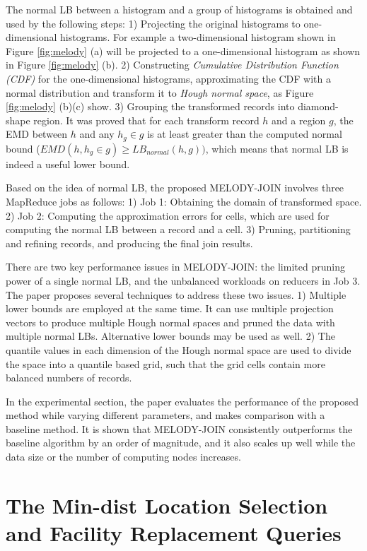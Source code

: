 \documentclass[paper=a4, fontsize=18pt]{article} %
\numberwithin{equation}{section} %
\numberwithin{figure}{section} %
\numberwithin{table}{section} %
\begin{document}
The normal LB between a histogram and a group of histograms is obtained and used by the following steps: 1) Projecting the original histograms to one-dimensional histograms. For example a two-dimensional histogram shown in Figure \ref{fig:melody} (a) will be projected to a one-dimensional histogram as shown in Figure \ref{fig:melody} (b). 2) Constructing \emph{Cumulative Distribution Function (CDF)} for the one-dimensional histograms, approximating the CDF with a normal distribution and transform it to \emph{Hough normal space}, as Figure \ref{fig:melody} (b)(c) show. 3) Grouping the transformed records into diamond-shape region. It was proved that for each transform record $h$ and a region $g$, the EMD between $h$ and any $h_g \in g$ is at least greater than the computed normal bound ($EMD(h, h_g \in g) \geq LB_{normal}(h,g))$, which means that normal LB is indeed a useful lower bound.

Based on the idea of normal LB, the proposed MELODY-JOIN involves three MapReduce jobs as follows: 1) Job 1: Obtaining the domain of transformed space. 2) Job 2: Computing the approximation errors for cells, which are used for computing the normal LB between a record and a cell. 3) Pruning, partitioning and refining records, and producing the final join results.

There are two key performance issues in MELODY-JOIN: the limited pruning power of a single normal LB, and the unbalanced workloads on reducers in Job 3. The paper proposes several techniques to address these two issues. 1) Multiple lower bounds are employed at the same time. It can use multiple projection vectors to produce multiple Hough normal spaces and pruned the data with multiple normal LBs. Alternative lower bounds may be used as well. 2) The quantile values in each dimension of the Hough normal space are used to divide the space into a quantile based grid, such that the grid cells contain more balanced numbers of records.

In the experimental section, the paper evaluates the performance of the proposed method while varying different parameters, and makes comparison with a baseline method. It is shown that MELODY-JOIN consistently outperforms the baseline algorithm by an order of magnitude, and it also scales up well while the data size or the number of computing nodes increases.

\section{The Min-dist Location Selection and Facility Replacement Queries \cite{QZWXYK14}}
\end{document}
